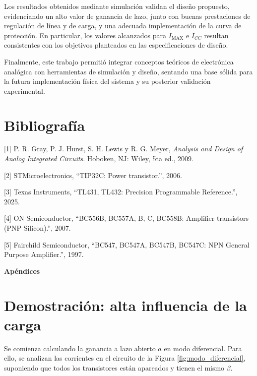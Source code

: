 \documentclass[a4paper,12pt]{article}
\begin{document}
Los resultados obtenidos mediante simulación validan el diseño propuesto, evidenciando un alto valor de ganancia de lazo, junto con buenas prestaciones de regulación de línea y de carga, y una adecuada implementación de la curva de protección. En particular, los valores alcanzados para $I_\text{MAX}$ e $I_{CC}$ resultan consistentes con los objetivos planteados en las especificaciones de diseño.

Finalmente, este trabajo permitió integrar conceptos teóricos de electrónica analógica con herramientas de simulación y diseño, sentando una base sólida para la futura implementación física del sistema y su posterior validación experimental.

\newpage

\section{Bibliografía}

[1] P. R. Gray, P. J. Hurst, S. H. Lewis y R. G. Meyer, \textit{Analysis and Design of Analog Integrated Circuits}. Hoboken, NJ: Wiley, 5ta ed., 2009.

[2] STMicroelectronics, ``TIP32C: Power transistor.'', 2006.

[3] Texas Instruments, ``TL431, TL432: Precision Programmable Reference.'', 2025.

[4] ON Semiconductor, ``BC556B, BC557A, B, C, BC558B: Amplifier transistors (PNP Silicon).'', 2007.

[5] Fairchild Semiconductor, ``BC547, BC547A, BC547B, BC547C: NPN General Purpose Amplifier.'', 1997.
 
\newpage

\appendix

\clearpage
\vspace*{1cm}

\begin{center}
    {\Huge \textbf{Apéndices}}
\end{center}

\vspace{1cm}

\section{Demostración: alta influencia de la carga}

Se comienza calculando la ganancia a lazo abierto $a$ en modo diferencial. Para ello, se analizan las corrientes en el circuito de la
Figura \ref{fig:modo_diferencial}, suponiendo que todos los transistores están apareados y tienen el mismo $\beta$.
\end{document}
